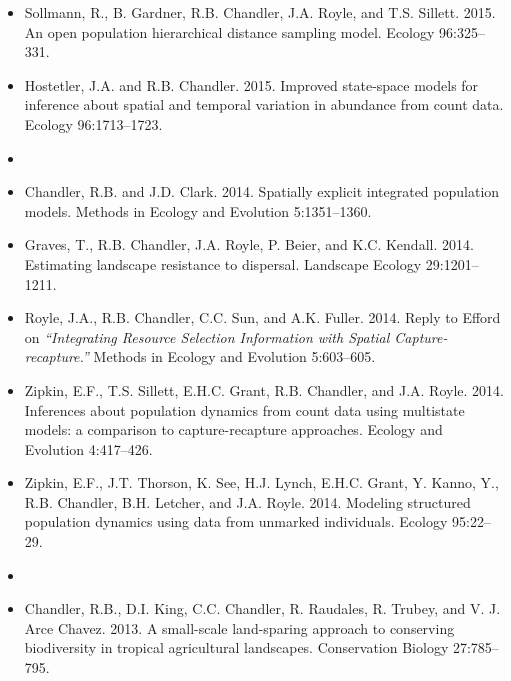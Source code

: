 \documentclass[12pt]{article}
\begin{document}
\begin{itemize}
\item Sollmann, R., B. Gardner, R.B. Chandler, J.A. Royle, and
  T.S. Sillett. 2015. An open population hierarchical
  distance sampling model. Ecology 96:325--331.

\item Hostetler, J.A. and R.B. Chandler. 2015. Improved
  state-space models for inference about spatial and temporal
  variation in abundance from count data. Ecology 96:1713--1723.

\item[] { \\}

\item Chandler, R.B. and J.D. Clark. 2014. Spatially
  explicit integrated population models. Methods in Ecology and
  Evolution 5:1351--1360.

\item Graves, T., R.B. Chandler, J.A. Royle, P. Beier, and
  K.C. Kendall. 2014. Estimating landscape resistance to
  dispersal. Landscape Ecology 29:1201--1211.

\item Royle, J.A., R.B. Chandler, C.C. Sun, and A.K. Fuller. 2014. 
  Reply to Efford on   {\it ``Integrating Resource Selection
    Information with Spatial Capture-recapture.''} Methods in Ecology
  and Evolution 5:603--605. 

\item Zipkin, E.F., T.S. Sillett, E.H.C. Grant, R.B. Chandler, and
  J.A. Royle. 2014. Inferences about population dynamics
  from count data using multistate models: a comparison to
  capture-recapture approaches. Ecology and Evolution 4:417--426.

\item Zipkin, E.F., J.T. Thorson, K. See, H.J. Lynch, E.H.C. Grant,
  Y. Kanno, Y., R.B. Chandler, B.H. Letcher, and J.A. Royle.
  2014. Modeling structured population dynamics using
  data from unmarked individuals. Ecology 95:22--29.


\item[] { \\}

\item Chandler, R.B., D.I. King, C.C. Chandler, R. Raudales,
  R. Trubey, and V. J. Arce Chavez. 2013. A small-scale
  land-sparing approach to conserving biodiversity in tropical
  agricultural landscapes. Conservation Biology 27:785--795. 


\end{itemize}
\end{document}
